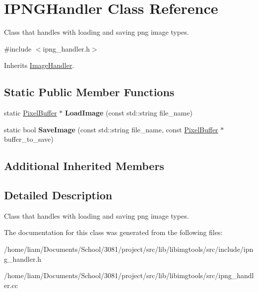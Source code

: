 \hypertarget{classIPNGHandler}{}\section{I\+P\+N\+G\+Handler Class Reference}
\label{classIPNGHandler}


Class that handles with loading and saving png image types.  




{\ttfamily \#include $<$ipng\+\_\+handler.\+h$>$}



Inherits \hyperlink{classImageHandler}{Image\+Handler}.

\subsection*{Static Public Member Functions}
\begin{DoxyCompactItemize}
\item 
static \hyperlink{classimage__tools_1_1PixelBuffer}{Pixel\+Buffer} $\ast$ {\bfseries Load\+Image} (const std\+::string file\+\_\+name)\hypertarget{classIPNGHandler_a171ba2129a9ec07e670b33cbb3b0d3df}{}\label{classIPNGHandler_a171ba2129a9ec07e670b33cbb3b0d3df}

\item 
static bool {\bfseries Save\+Image} (const std\+::string file\+\_\+name, const \hyperlink{classimage__tools_1_1PixelBuffer}{Pixel\+Buffer} $\ast$buffer\+\_\+to\+\_\+save)\hypertarget{classIPNGHandler_a4d021dca0cb64eb57416570f5635b3ea}{}\label{classIPNGHandler_a4d021dca0cb64eb57416570f5635b3ea}

\end{DoxyCompactItemize}
\subsection*{Additional Inherited Members}


\subsection{Detailed Description}
Class that handles with loading and saving png image types. 

The documentation for this class was generated from the following files\+:\begin{DoxyCompactItemize}
\item 
/home/liam/\+Documents/\+School/3081/project/src/lib/libimgtools/src/include/ipng\+\_\+handler.\+h\item 
/home/liam/\+Documents/\+School/3081/project/src/lib/libimgtools/src/ipng\+\_\+handler.\+cc\end{DoxyCompactItemize}
